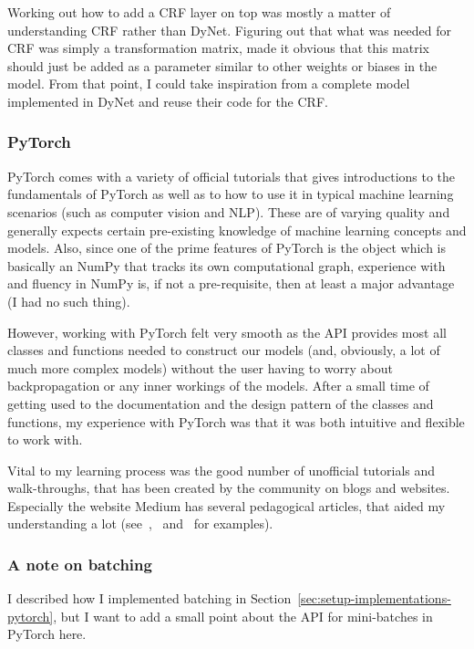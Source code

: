Working out how to add a CRF layer on top was mostly a matter of understanding
CRF rather than DyNet. Figuring out that what was needed for CRF was simply a
transformation matrix, made it obvious that this matrix should just be added as
a parameter similar to other weights or biases in the model. From that point, I
could take inspiration from a complete model implemented in DyNet and reuse
their code for the CRF.\

\subsubsection{PyTorch}

PyTorch comes with a variety of official tutorials that gives introductions to
the fundamentals of PyTorch as well as to how to use it in typical machine
learning scenarios (such as computer vision and NLP). These are of varying
quality and generally expects certain pre-existing knowledge of machine learning
concepts and models. Also, since one of the prime features of PyTorch is the
 object which is basically an NumPy  that tracks its
own computational graph, experience with and fluency in NumPy is, if not a
pre-requisite, then at least a major advantage (I had no such thing).

However, working with PyTorch felt very smooth as the API provides most all
classes and functions needed to construct our models (and, obviously, a lot of
much more complex models) without the user having to worry about backpropagation
or any inner workings of the models. After a small time of getting used to the
documentation and the design pattern of the classes and functions, my experience
with PyTorch was that it was both intuitive and flexible to work with.

Vital to my learning process was the good number of unofficial tutorials and
walk-throughs, that has been created by the community on blogs and websites.
Especially the website Medium has several pedagogical articles, that aided my
understanding a lot (see~\cite{falcon2018lstms},~\cite{boulton2018conditional}
and~\cite{treviso2019crf} for examples).

\subsubsection*{A note on batching}

I described how I implemented batching in
Section~\ref{sec:setup-implementations-pytorch}, but I want to add a small point
about the API for mini-batches in PyTorch here.

